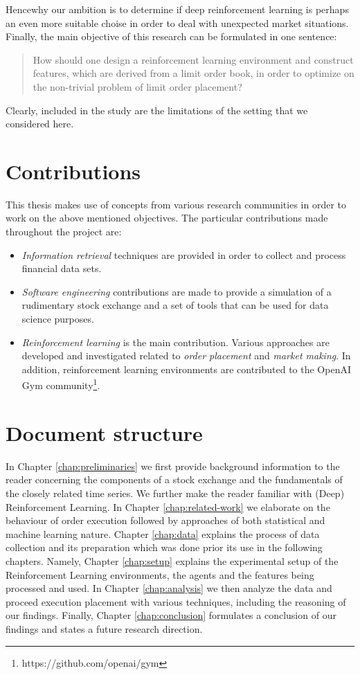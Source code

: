 Hencewhy our ambition is to determine if deep reinforcement learning is perhaps an even more suitable choise in order to deal with unexpected market situations.
Finally, the main objective of this research can be formulated in one sentence:
\begin{quote}
    How should one design a reinforcement learning environment and construct features, which are derived from a limit order book, in order to optimize on the non-trivial problem of limit order placement?
\end{quote}
Clearly, included in the study are the limitations of the setting that we considered here.

\section{Contributions}

This thesis makes use of concepts from various research communities in order to work on the above mentioned objectives.
The particular contributions made throughout the project are:
\begin{itemize}
    \item \textit{Information retrieval} techniques are provided in order to collect and process financial data sets.
    \item \textit{Software engineering} contributions are made to provide a simulation of a rudimentary stock exchange and a set of tools that can be used for data science purposes.
    \item \textit{Reinforcement learning} is the main contribution.
    Various approaches are developed and investigated related to \textit{order placement} and \textit{market making}.
    In addition, reinforcement learning environments are contributed to the OpenAI Gym community\footnote{https://github.com/openai/gym}.
\end{itemize}


\section{Document structure}

In Chapter \ref{chap:preliminaries} we first provide background information to the reader concerning the components of a stock exchange and the fundamentals of the closely related time series.
We further make the reader familiar with (Deep) Reinforcement Learning.
In Chapter \ref{chap:related-work} we elaborate on the behaviour of order execution followed by approaches of both statistical and machine learning nature.
Chapter \ref{chap:data} explains the process of data collection and its preparation which was done prior its use in the following chapters.
Namely, Chapter \ref{chap:setup} explains the experimental setup of the Reinforcement Learning environments, the agents and the features being processed and used.
In Chapter \ref{chap:analysis} we then analyze the data and proceed execution placement with various techniques, including the reasoning of our findings.
Finally, Chapter \ref{chap:conclusion} formulates a conclusion of our findings and states a future research direction.
